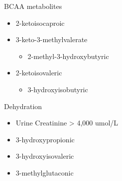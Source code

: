 \documentclass[presentation, smaller]{beamer}
\begin{document}
\begin{frame}[label={sec:orgheadline8}]{BCAA metabolites}
\begin{itemize}
\item 2-ketoisocaproic
\item 3-keto-3-methylvalerate
\begin{itemize}
\item 2-methyl-3-hydroxybutyric
\end{itemize}
\item 2-ketoisovaleric
\begin{itemize}
\item 3-hydroxyisobutyric
\end{itemize}
\end{itemize}
\end{frame}



\begin{frame}[label={sec:orgheadline9}]{Dehydration}
\begin{itemize}
\item Urine Creatinine > 4,000 umol/L
\item 3-hydroxypropionic
\item 3-hydroxyisovaleric
\item 3-methylglutaconic
\end{itemize}
\end{frame}
\end{document}
